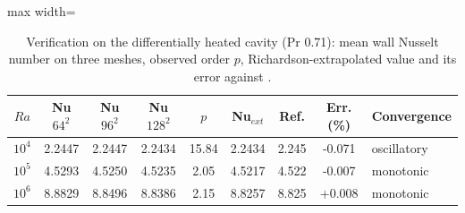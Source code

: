 \begin{table}[htbp]\centering\footnotesize
\caption{Verification on the differentially heated cavity (Pr 0.71): mean wall Nusselt number on three meshes, observed order $p$, Richardson-extrapolated value and its error against \citet{hortmann1990}.}\label{tab:verify}
\begin{adjustbox}{max width=\linewidth}
\begin{tabular}{ccccccccl}
\toprule
$Ra$ & Nu $64^2$ & Nu $96^2$ & Nu $128^2$ & $p$ & Nu$_{ext}$ & Ref. & Err. (\%) & Convergence \\
\midrule
$10^{4}$ & 2.2447 & 2.2447 & 2.2434 & 15.84 & 2.2434 & 2.245 & -0.071 & oscillatory \\
$10^{5}$ & 4.5293 & 4.5250 & 4.5235 & 2.05 & 4.5217 & 4.522 & -0.007 & monotonic \\
$10^{6}$ & 8.8829 & 8.8496 & 8.8386 & 2.15 & 8.8257 & 8.825 & +0.008 & monotonic \\
\bottomrule
\end{tabular}
\end{adjustbox}
\end{table}
